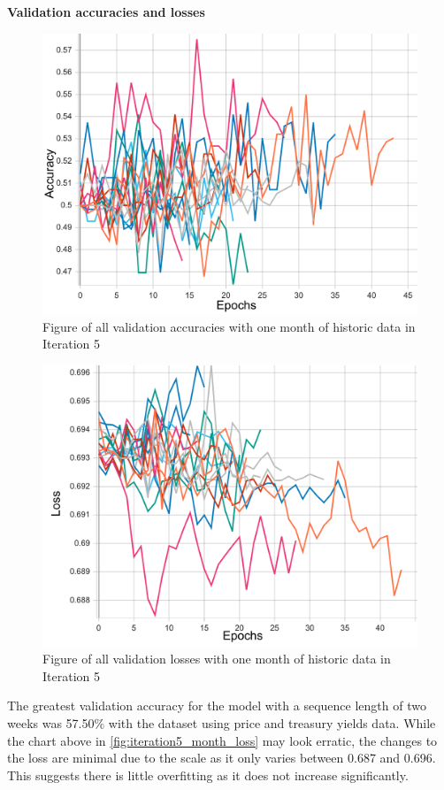 \pagebreak
\textbf{Validation accuracies and losses}
\begin{figure}[ht]
    \centering
    \includegraphics[width=0.575\columnwidth]{figures/results/final/month_acc.pdf}
    \caption[Validation accuracies for Iteration 5 with one month of historic data]{Figure of all validation accuracies with one month of historic data in Iteration 5}
    \label{fig:iteration5_month_accuracy}
\end{figure}
\FloatBarrier

\begin{figure}[ht]
    \centering
    \includegraphics[width=0.575\columnwidth]{figures/results/final/month_loss.pdf}
    \caption[Validation losses for Iteration 5 with one month of historic data]{Figure of all validation losses with one month of historic data in Iteration 5}
    \label{fig:iteration5_month_loss}
\end{figure}
\FloatBarrier

The greatest validation accuracy for the model with a sequence length of two weeks was 57.50\% with the dataset using price
and treasury yields data.
While the chart above in \autoref{fig:iteration5_month_loss} may look erratic, the changes to the loss are minimal due to the scale as it only varies
between 0.687 and 0.696. This suggests there is little overfitting as it does not increase significantly.

\pagebreak
